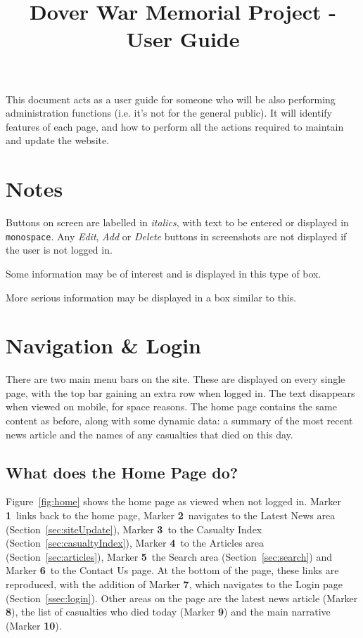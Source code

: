 \documentclass[12pt]{article}
\title{\vspace{-1cm}\textbf{Dover War Memorial Project - User Guide}\vspace{-1cm}}
\date{}
\author{}
\newcommand{\marker}[1]{Marker \color{red}\textbf{#1}\color{black}}
\begin{document}
\maketitle

This document acts as a user guide for someone who will be also performing administration functions (i.e. it's not for the general public). It will identify features of each page, and how to perform all the actions required to maintain and update the website.

\tableofcontents

\section{Notes}
Buttons on screen are labelled in \textit{italics}, with text to be entered or displayed in \texttt{monospace}. Any \textit{Edit}, \textit{Add} or \textit{Delete} buttons in screenshots are not displayed if the user is not logged in.

\begin{infoBox}
Some information may be of interest and is displayed in this type of box.
\end{infoBox}

\begin{warningBox}
More serious information may be displayed in a box similar to this.
\end{warningBox}

\newpage

\section{Navigation \& Login}
There are two main menu bars on the site. These are displayed on every single page, with the top bar gaining an extra row when logged in. The text disappears when viewed on mobile, for space reasons. The home page contains the same content as before, along with some dynamic data: a summary of the most recent news article and the names of any casualties that died on this day.

\subsection{What does the Home Page do?}
Figure~\ref{fig:home} shows the home page as viewed when not logged in. \marker{1}\ links back to the home page, \marker{2}\ navigates to the Latest News area (Section~\ref{sec:siteUpdate}), \marker{3}\ to the Casualty Index (Section~\ref{sec:casualtyIndex}), \marker{4}\ to the Articles area (Section~\ref{sec:articles}), \marker{5}\ the Search area (Section~\ref{sec:search}) and \marker{6}\ to the Contact Us page. At the bottom of the page, these links are reproduced, with the addition of \marker{7}, which navigates to the Login page (Section~\ref{ssec:login}). Other areas on the page are the latest news article (\marker{8}), the list of casualties who died today (\marker{9}) and the main narrative (\marker{10}).
\end{document}
